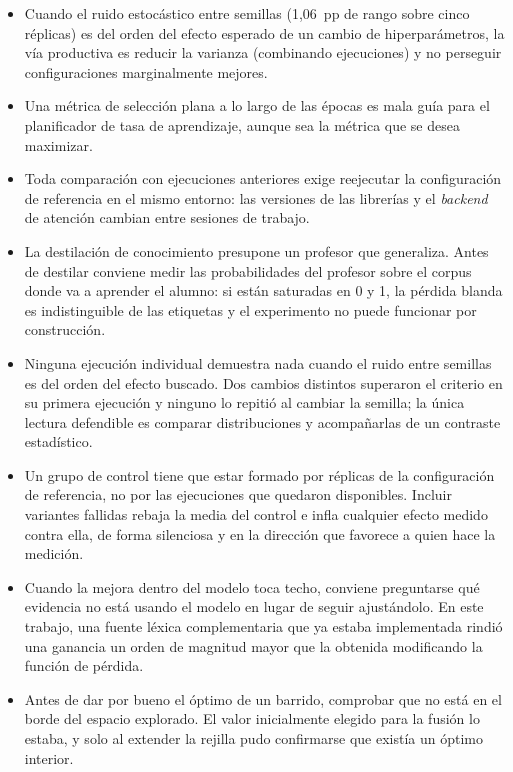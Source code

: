 \begin{itemize}
 \item Cuando el ruido estocástico entre semillas (1{,}06~pp de rango sobre cinco réplicas) es del orden del efecto esperado de un cambio de hiperparámetros, la vía productiva es reducir la varianza (combinando ejecuciones) y no perseguir configuraciones marginalmente mejores.
 \item Una métrica de selección plana a lo largo de las épocas es mala guía para el planificador de tasa de aprendizaje, aunque sea la métrica que se desea maximizar.
 \item Toda comparación con ejecuciones anteriores exige reejecutar la configuración de referencia en el mismo entorno: las versiones de las librerías y el \emph{backend} de atención cambian entre sesiones de trabajo.
 \item La destilación de conocimiento presupone un profesor que generaliza. Antes de destilar conviene medir las probabilidades del profesor sobre el corpus donde va a aprender el alumno: si están saturadas en 0 y 1, la pérdida blanda es indistinguible de las etiquetas y el experimento no puede funcionar por construcción.
 \item Ninguna ejecución individual demuestra nada cuando el ruido entre semillas es del orden del efecto buscado. Dos cambios distintos superaron el criterio en su primera ejecución y ninguno lo repitió al cambiar la semilla; la única lectura defendible es comparar distribuciones y acompañarlas de un contraste estadístico.
 \item Un grupo de control tiene que estar formado por réplicas de la configuración de referencia, no por las ejecuciones que quedaron disponibles. Incluir variantes fallidas rebaja la media del control e infla cualquier efecto medido contra ella, de forma silenciosa y en la dirección que favorece a quien hace la medición.
 \item Cuando la mejora dentro del modelo toca techo, conviene preguntarse qué evidencia no está usando el modelo en lugar de seguir ajustándolo. En este trabajo, una fuente léxica complementaria que ya estaba implementada rindió una ganancia un orden de magnitud mayor que la obtenida modificando la función de pérdida.
 \item Antes de dar por bueno el óptimo de un barrido, comprobar que no está en el borde del espacio explorado. El valor inicialmente elegido para la fusión lo estaba, y solo al extender la rejilla pudo confirmarse que existía un óptimo interior.
\end{itemize}



